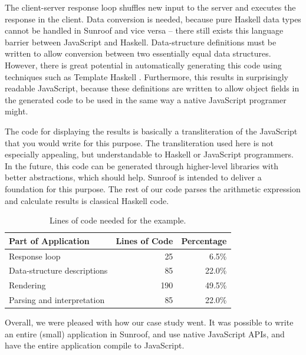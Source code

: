 \documentclass{llncs}
\begin{document}
The client-server response loop shuffles new input to the server 
and executes the response in the client.
%
Data conversion is needed, because pure Haskell data types
cannot be handled in Sunroof and vice versa -- there still
exists this language barrier between JavaScript and Haskell. 
Data-structure definitions must be written
to allow conversion between two essentially equal data structures.
However, there is great potential in automatically 
generating this code using techniques such as Template Haskell
\cite{Sheard:02:TemplateMetaProgrammingHaskell}.
Furthermore, this results in surprisingly readable JavaScript,
because these definitions are written to allow object fields
in the generated code to be used in the same way a native JavaScript
programer might.

The code for displaying the results is basically a 
transliteration of the JavaScript that you would write for this 
purpose.
The transliteration used here is not especially appealing,
but understandable to Haskell or JavaScript programmers.
In the future, this code can be generated through higher-level 
libraries with better abstractions, which should help.
Sunroof is intended to deliver a foundation for this purpose.
The rest of our code parses the arithmetic expression and calculate 
results is classical Haskell code. 

\begin{table}[t]
\begin{center}
\vspace{0.1in}
\begin{tabular}{l@{\quad}r@{\quad}r}
\hline\rule{0pt}{12pt}%
Part of Application & Lines of Code & Percentage \\[2pt]
\hline\rule{0pt}{12pt}%
Response loop & 25 & 6.5\% \\[2pt]
Data-structure descriptions & 85 & 22.0\% \\[2pt]
Rendering & 190 & 49.5\% \\[2pt]
Parsing and interpretation & 85 & 22.0\% \\[2pt]
\hline
\end{tabular}
\end{center}
\caption{Lines of code needed for the example.}
\label{tab:example-statistics}
\vspace{-0.5cm}
\end{table} 

Overall, we were pleased with how our case study went.
It was possible to write an entire (small) application
in Sunroof, and use native JavaScript APIs, and have
the entire application compile to JavaScript. 
\end{document}
